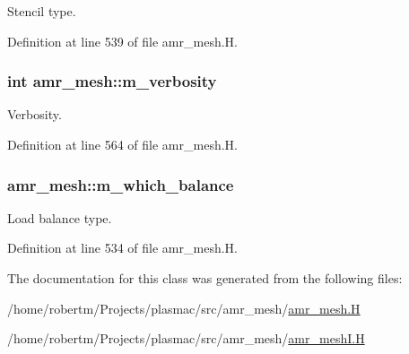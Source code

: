 Stencil type. 



Definition at line 539 of file amr\+\_\+mesh.\+H.

\subsubsection[{\texorpdfstring{m\+\_\+verbosity}{m_verbosity}}]{\setlength{\rightskip}{0pt plus 5cm}int amr\+\_\+mesh\+::m\+\_\+verbosity\hspace{0.3cm}{\ttfamily [protected]}}\hypertarget{classamr__mesh_a5038b3f9e7d3e6df7c0851fd983a9b10}{}\label{classamr__mesh_a5038b3f9e7d3e6df7c0851fd983a9b10}


Verbosity. 



Definition at line 564 of file amr\+\_\+mesh.\+H.

\subsubsection[{\texorpdfstring{m\+\_\+which\+\_\+balance}{m_which_balance}}]{ amr\+\_\+mesh\+::m\+\_\+which\+\_\+balance\hspace{0.3cm}{\ttfamily [protected]}}\hypertarget{classamr__mesh_ae583f1a97486c3051132f24330be6e03}{}\label{classamr__mesh_ae583f1a97486c3051132f24330be6e03}


Load balance type. 



Definition at line 534 of file amr\+\_\+mesh.\+H.



The documentation for this class was generated from the following files\+:\begin{DoxyCompactItemize}
\item 
/home/robertm/\+Projects/plasmac/src/amr\+\_\+mesh/\hyperlink{amr__mesh_8H}{amr\+\_\+mesh.\+H}\item 
/home/robertm/\+Projects/plasmac/src/amr\+\_\+mesh/\hyperlink{amr__meshI_8H}{amr\+\_\+mesh\+I.\+H}\end{DoxyCompactItemize}
